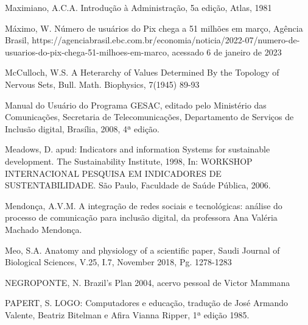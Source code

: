 \begin{flushleft}
[MAXIMIANO, 1981] Maximiano, A.C.A. Introdução à Administração, 5a edição, Atlas, 1981
\end{flushleft}


\begin{flushleft}
[MÁXIMO, 2022] Máximo, W. Número de usuários do Pix chega a 51 milhões em março, Agência Brasil, https://agenciabrasil.ebc.com.br/economia/noticia/2022-07/numero-de-usuarios-do-pix-chega-51-milhoes-em-marco, acessado 6 de janeiro de 2023
\end{flushleft}


\begin{flushleft}
[McCULLOCH, 1945] McCulloch, W.S. A Heterarchy of Values Determined By the Topology of Nervous Sets, Bull. Math. Biophysics, 7(1945) 89-93
\end{flushleft}


\begin{flushleft}
[MC, 2008] Manual do Usuário do Programa GESAC, editado pelo Ministério das Comunicações, Secretaria de Telecomunicações, Departamento de Serviços de Inclusão digital,  Brasília, 2008, 4ª edição.
\end{flushleft}


\begin{flushleft}
[MEADOWS, 2006] Meadows, D. apud: Indicators and information Systems for sustainable development. The Sustainability Institute, 1998, In: WORKSHOP INTERNACIONAL PESQUISA EM INDICADORES DE SUSTENTABILIDADE. São Paulo, Faculdade de Saúde Pública, 2006.
\end{flushleft}


\begin{flushleft}
[MENDONÇA, 2015] Mendonça, A.V.M. A integração de redes sociais e tecnológicas: análise do processo de comunicação para inclusão digital, da professora Ana Valéria  Machado  Mendonça.
\end{flushleft}


\begin{flushleft}
[MEO, 2018] Meo, S.A. Anatomy and physiology of a scientific paper, Saudi Journal of Biological Sciences, V.25, I.7, November 2018, Pg. 1278-1283
\end{flushleft}


\begin{flushleft}
[NEGROPONTE, 2004] NEGROPONTE, N. Brazil's Plan 2004, acervo pessoal de Victor Mammana
\end{flushleft}


\begin{flushleft}
[PAPERT, 1980] PAPERT, S. LOGO: Computadores e educação, tradução de José Armando Valente, Beatriz Bitelman e Afira Vianna Ripper, 1ª edição 1985.
\end{flushleft}


